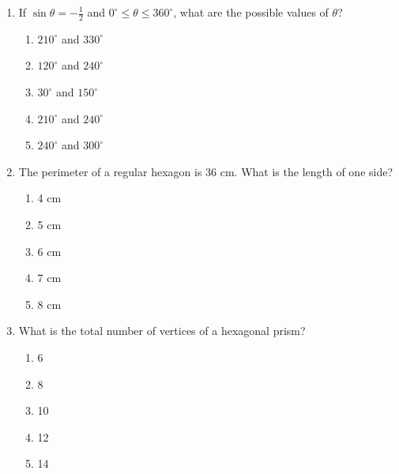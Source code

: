 \documentclass[12pt]{article}
\newenvironment{questionblock}[1][10]{
    \par\Needspace{#1\baselineskip}
}{
    \par
}
\begin{document}
\begin{enumerate}
\begin{enumerate}[label=(\roman*)]
    \begin{questionblock}
      \item If $\sin \theta = -\frac{1}{2}$ and $0^{\circ} \leq \theta \leq 360^{\circ}$, what are the possible values of $\theta$?
      \begin{enumerate}[label=\Alph*.]
        \item $210^{\circ}$ and $330^{\circ}$
        \item $120^{\circ}$ and $240^{\circ}$
        \item $30^{\circ}$ and $150^{\circ}$
        \item $210^{\circ}$ and $240^{\circ}$
        \item $240^{\circ}$ and $300^{\circ}$
      \end{enumerate}
      \vspace{0.8em}
    \end{questionblock}

    \begin{questionblock}
      \item The perimeter of a regular hexagon is 36 cm. What is the length of one side?
      \begin{enumerate}[label=\Alph*.]
        \item 4 cm
        \item 5 cm
        \item 6 cm
        \item 7 cm
        \item 8 cm
      \end{enumerate}
      \vspace{0.8em}
    \end{questionblock}

    \begin{questionblock}
      \item What is the total number of vertices of a hexagonal prism?
      \begin{enumerate}[label=\Alph*.]
        \item 6
        \item 8
        \item 10
        \item 12
        \item 14
      \end{enumerate}
      \vspace{0.8em}
    \end{questionblock}


\end{enumerate}
\end{enumerate}
\end{document}
